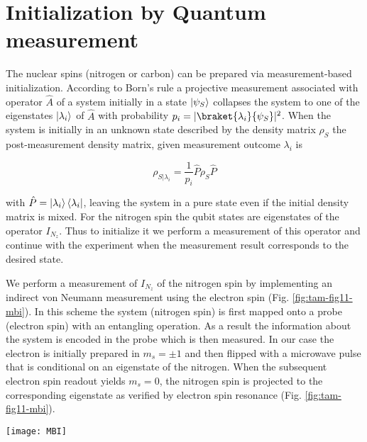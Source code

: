 \section{Initialization by Quantum measurement}
The nuclear spins (nitrogen or carbon) can be prepared via measurement-based initialization\cite{Robledo_Nature_2011}. According to Born's rule a projective measurement associated with operator $\hat{A}$ of a system initially in a state $\left|\psi_S\right>$ collapses the system to one of the eigenstates $\left|\lambda_i\right>$ of $\hat{A}$ with probability $p_i = |\braket{\lambda_i}{\psi_S}|^2$. When the system is initially in an unknown state described by the density matrix $\rho_S$ the post-measurement density matrix, given measurement outcome $\lambda_i$ is

\begin{equation}
\rho_{S|\lambda_i} = \frac{1}{p_i}\hat{P}\rho_S\hat{P}
\end{equation}

with $\hat{P}=\left|\lambda_i\right>\left<\lambda_i\right|$, leaving the system in a pure state even if the initial density matrix is mixed. For the nitrogen spin the qubit states are eigenstates of the operator $I_{N_z}$. Thus to initialize it we perform a measurement of this operator and continue with the experiment when the measurement result corresponds to the desired state.

We perform a measurement of $I_{N_z}$ of the nitrogen spin by implementing an indirect von Neumann measurement using the electron spin (Fig. \ref{fig:tam-fig11-mbi}). In this scheme the system (nitrogen spin) is first mapped onto a probe (electron spin) with an entangling operation. As a result the information about the system is encoded in the probe which is then measured. In our case the electron is initially prepared in $m_s= \pm 1$ and then flipped with a microwave pulse that is conditional on an eigenstate of the nitrogen. When the subsequent electron spin readout yields $m_s = 0$, the nitrogen spin is projected to the corresponding eigenstate as verified by electron spin resonance (Fig. \ref{fig:tam-fig11-mbi}).

\begin{figure*}
	\centering
	\texttt{[image: MBI]}
	\caption{\label{fig:tam-fig11-mbi} \textbf{Measurement-based initialization of the nitrogen spin}. Pulsed electron spin resonance for no initialization of the nitrogen spin (grey) and after performing measurement-based initialization of the nitrogen spin in $m_I = -1$ (red) and $m_I = 0$ (blue). The polarization of the nitrogen spin is inferred from the depth of the observed resonances.}
\end{figure*}

